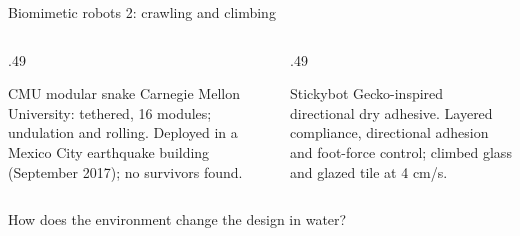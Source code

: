 \documentclass[aspectratio=169]{beamer}
\begin{document}
\begin{frame}[t]{Biomimetic robots 2: crawling and climbing}
\footnotesize
\vspace{-3mm}
\begin{columns}[T,onlytextwidth]\begin{column}{.49\textwidth}
\centering{}\par\vspace{-2mm}\begin{block}{CMU modular snake}
Carnegie Mellon University: tethered, 16 modules; undulation and rolling. Deployed in a Mexico City earthquake building (September 2017); no survivors found.
\end{block}

\end{column}\begin{column}{.49\textwidth}
\centering{}\par\vspace{-2mm}\begin{block}{Stickybot}
Gecko-inspired directional dry adhesive. Layered compliance, directional adhesion and foot-force control; climbed glass and glazed tile at 4 cm/s.
\end{block}

\end{column}\end{columns}
\par\vspace{0.5mm}\footnotesize How does the environment change the design in water?
\end{frame}
\end{document}
